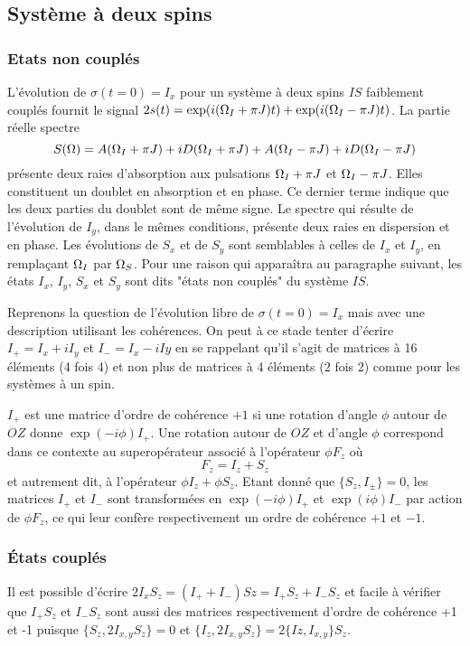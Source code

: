 \subsection{Système à deux spins}

\subsubsection{Etats non couplés}
L'évolution de $\sigma(t=0) = I_x$ pour un système à deux spins $IS$ 
faiblement couplés fournit le signal 
$2s(t) = \exp(i (\Omega_I + \pi J) t) + \exp(i (\Omega_I - \pi J) t)$. 
La partie réelle spectre 
\begin{equation}
S(\Omega) = A(\Omega_I + \pi J) + iD(\Omega_I + \pi J) + A(\Omega_I - \pi J) + iD(\Omega_I - \pi J)
\end{equation}
présente deux raies 
d'absorption aux pulsations $\Omega_I + \pi J$ et $\Omega_I - \pi J$.
Elles constituent un doublet en absorption et en phase.
Ce dernier terme indique que les deux parties du doublet sont de même signe.
Le spectre qui résulte de l'évolution de $I_y$, dans le mêmes conditions,
présente deux raies en dispersion et en phase. 
Les évolutions de $S_x$ et de $S_y$ sont semblables à celles de $I_x$ et $I_y$,
en remplaçant $\Omega_I$ par $\Omega_S$.
Pour une raison qui apparaîtra au paragraphe suivant, les états
$I_x$, $I_y$, $S_x$ et $S_y$ sont dits "états non couplés" du système $IS$.

Reprenons la question de l'évolution libre de $\sigma(t=0) = I_x$ mais
avec une description utilisant les cohérences.
On peut à ce stade tenter d'écrire $I_+ = I_x + iI_y$ et $I_- = I_x - iIy$
en se rappelant qu'il s'agit de matrices à 16 éléments (4 fois 4) et non plus
de matrices à 4 éléments (2 fois 2) comme pour les systèmes à un spin.

$I_+$ est une matrice d'ordre de cohérence $+1$ 
si une rotation d'angle $\phi$ autour de $OZ$
donne $\exp(-i\phi)I_+$.
Une rotation autour de $OZ$ et d'angle $\phi$ correspond dans ce contexte
au superopérateur associé à l'opérateur $\phi F_z$ où 
\begin{equation}
\label{eqn:operateurf}
F_z = I_z + S_z
\end{equation}
et autrement dit, à l'opérateur $\phi I_z + \phi S_z$.
Etant donné que $\{S_z, I_{\pm}\} = 0$, 
les matrices $I_+$ et $I_-$ sont transformées
en $\exp(-i \phi) I_+$ et $\exp(i \phi) I_-$ par action de $\phi F_z$,
ce qui leur confère respectivement un ordre de cohérence $+1$ et $-1$.

\subsubsection{États couplés}
Il est possible d'écrire $2I_xS_z = (I_+ + I_-)Sz = I_+S_z + I_-S_z$
et facile à vérifier que $I_+S_z$ et $I_-S_z$ sont aussi des matrices respectivement
d'ordre de cohérence +1 et -1 puisque $\{S_z, 2I_{x,y}S_z\} = 0$ et 
$\{I_z, 2I_{x,y}S_z\} = 2\{Iz, I_{x,y}\}S_z$.

